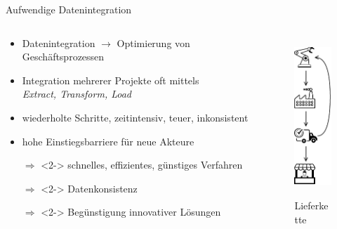 \begin{frame}{Aufwendige Datenintegration}
    \begin{columns}
        \begin{column}{0.7\textwidth}
            \begin{itemize}
                \item Datenintegration $\to$ Optimierung von Geschäftsprozessen
                \item Integration mehrerer Projekte oft mittels\\
                    \emph{Extract, Transform, Load}
                \item wiederholte Schritte, zeitintensiv, teuer, inkonsistent
                \item hohe Einstiegsbarriere für neue Akteure
        
                \item[$\Rightarrow$]<2-> schnelles, effizientes, günstiges Verfahren
                \item[$\Rightarrow$]<2-> Datenkonsistenz
                \item[$\Rightarrow$]<2-> Begünstigung innovativer Lösungen
            \end{itemize}
        \end{column}

        \begin{column}{0.3\textwidth}
            \addtocounter{figure}{-1}
            \begin{figure}
                \centering
                \includegraphics[height=6cm]{./assets/supply_chain.drawio.pdf}
                \caption{Lieferkette}
            \end{figure}
        \end{column}
    \end{columns}
\end{frame}


